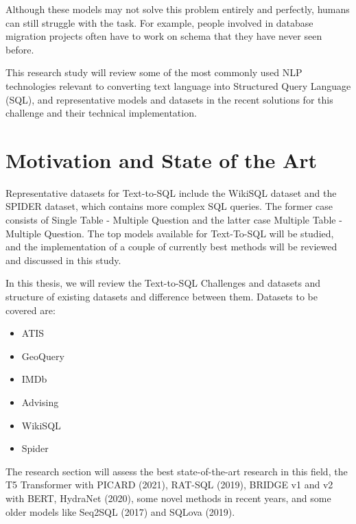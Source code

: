 Although these models may not solve this problem entirely and perfectly, humans can still struggle with the task. For example, people involved in database migration projects often have to work on schema that they have never seen before.

This research study will review some of the most commonly used NLP technologies relevant to converting text language into Structured Query Language (SQL), and representative models and datasets in the recent solutions for this challenge and their technical implementation.

\newpage

\section{Motivation and State of the Art}

Representative datasets for Text-to-SQL include the WikiSQL\cite{zhong_seq2sql_2017} dataset and the SPIDER\cite{yu_spider_2019} dataset, which contains more complex SQL queries. 
The former case consists of Single Table - Multiple Question and the latter case Multiple Table - Multiple Question. The top models available for Text-To-SQL will be studied, and the implementation of a couple of currently best methods will be reviewed and discussed in this study. 

In this thesis, we will review the Text-to-SQL Challenges and datasets and structure of existing datasets and difference between them. Datasets to be covered are:
\begin{itemize}
\item ATIS
\item GeoQuery
\item IMDb
\item Advising
\item WikiSQL
\item Spider
\end{itemize}
The research section will assess the best state-of-the-art research in this field, the T5\cite{raffel_exploring_2020} Transformer with PICARD\cite{scholak_picard_2021} (2021), RAT-SQL\cite{wang_rat-sql_2021} (2019), BRIDGE v1 and v2\cite{lin_bridging_2020} with BERT, HydraNet\cite{lyu_hybrid_2020} (2020), some novel methods in recent years, and some older models like Seq2SQL\cite{zhong_seq2sql_2017} (2017) and SQLova\cite{hwang_comprehensive_2019} (2019).

